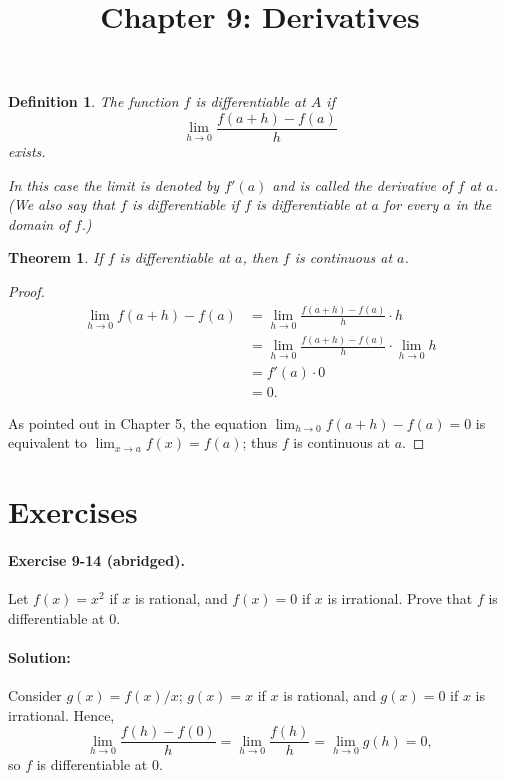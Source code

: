 \documentclass{article}
\newtheorem{definition}{Definition}
\newtheorem{theorem}{Theorem}
\begin{document}
\title{Chapter 9: Derivatives}
\maketitle

\begin{definition}
  The function $f$ is \emph{differentiable at $A$} if \begin{equation*}
    \lim_{h \rightarrow 0}\frac{f(a + h) - f(a)}{h}
  \end{equation*} exists.

  In this case the limit is denoted by $f'(a)$ and is called the
  \emph{derivative of $f$ at $a$}. (We also say that $f$ is
  \emph{differentiable} if $f$ is differentiable at $a$ for every $a$ in the
  domain of $f$.)
\end{definition}

\begin{theorem}
  If $f$ is differentiable at $a$, then $f$ is continuous at $a$.
\end{theorem}

\begin{proof}
  \begin{align*}
    \lim_{h \rightarrow 0}{f(a + h) - f(a)} &= \lim_{h \rightarrow 0}{\frac
      {f(a + h) - f(a)}{h} \cdot h} \\
      &= \lim_{h \rightarrow 0}{\frac{f(a + h) - f(a)}{h} \cdot \lim_{h
        \rightarrow 0}h} \\
      &= f'(a) \cdot 0 \\
      &= 0.
  \end{align*}

  As pointed out in Chapter 5, the equation $\lim_{h \rightarrow 0}{f(a + h) -
  f(a)} = 0$ is equivalent to $\lim_{x \rightarrow a}{f(x)} = f(a)$; thus $f$
  is continuous at $a$.
\end{proof}

\section*{Exercises}

\paragraph{Exercise 9-14 (abridged).} Let $f(x) = x^2$ if $x$ is rational, and
$f(x) = 0$ if $x$ is irrational. Prove that $f$ is differentiable at 0.

\paragraph{Solution:} Consider $g(x) = f(x)/x$; $g(x) = x$ if $x$ is rational,
and $g(x) = 0$ if $x$ is irrational. Hence, \begin{equation*}
  \lim_{h \rightarrow 0}{\frac{f(h) - f(0)}{h}} = \lim_{h \rightarrow 0}{\frac
  {f(h)}{h}} = \lim_{h \rightarrow 0}{g(h)} = 0,
\end{equation*} so $f$ is differentiable at 0.
\end{document}
